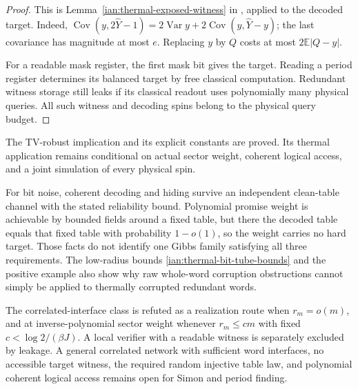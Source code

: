 \begin{proof}
This is Lemma~\ref{ian:thermal-exposed-witness} in
, applied to the decoded target.
Indeed,
\(\operatorname{Cov}(y,2\widehat Y-1)
=2\operatorname{Var}y+2\operatorname{Cov}(y,\widehat Y-y)\);
the last covariance has magnitude at most \(e\).
Replacing \(y\) by \(Q\) costs at most
\(2\mathbb E|Q-y|\).

For a readable mask register, the first mask bit gives the target.
Reading a period register determines its balanced target by free
classical computation. Redundant witness storage still leaks if
its classical readout uses polynomially many physical queries.
All such witness and decoding spins belong to the physical query
budget.
\end{proof}

\begin{remark}
\label{ian:thermal-robust-frontier}
The TV-robust implication and its explicit constants are proved.
Its thermal application remains conditional on actual sector
weight, coherent logical access, and a joint simulation of every
physical spin.

For bit noise, coherent decoding and hiding survive an independent
clean-table channel with the stated reliability bound. Polynomial
promise weight is achievable by bounded fields around a fixed
table, but there the decoded table equals that fixed table with
probability \(1-o(1)\), so the weight carries no hard target.
Those facts do not identify one Gibbs family satisfying
all three requirements. The low-radius bounds
\eqref{ian:thermal-bit-tube-bounds} and the positive example also
show why raw whole-word corruption obstructions cannot simply be
applied to thermally corrupted redundant words.

The correlated-interface class is refuted as a realization route
when \(r_m=o(m)\), and at inverse-polynomial sector weight whenever
\(r_m\le cm\) with fixed \(c<\log2/(\beta J)\). A local verifier with
a readable witness is separately excluded by leakage. A general
correlated network with sufficient word interfaces, no accessible
target witness, the required random injective table law, and
polynomial coherent logical access remains open for Simon and period
finding.
\end{remark}
